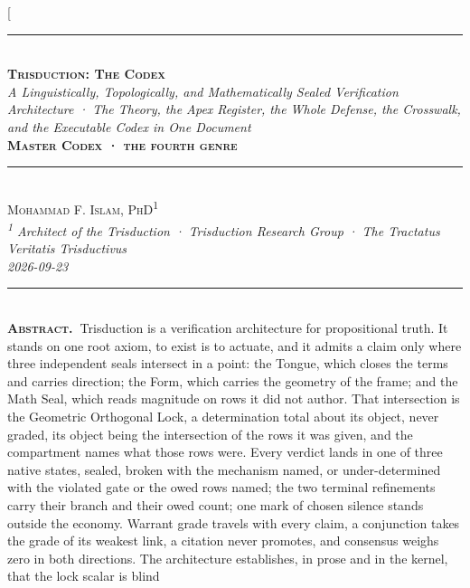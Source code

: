 \documentclass[10pt,twocolumn]{article}
\begin{document}
\twocolumn[{%
\begin{center}
{\color{accent}\rule{0.6\textwidth}{0.8pt}}\\[10pt]
{\bfseries\scshape\fontsize{20}{23}\selectfont Trisduction: The
Codex}\\[7pt]
{\itshape\large A Linguistically, Topologically, and Mathematically
Sealed Verification Architecture · The Theory, the Apex Register, the
Whole Defense, the Crosswalk, and the Executable Codex in One
Document}\\[8pt]
{\footnotesize\color{accent}\scshape\bfseries Master Codex · the fourth
genre}\\[3pt]

{\color{accent}\rule{0.6\textwidth}{0.8pt}}\\[10pt]
{\scshape Mohammad F. Islam, PhD\textsuperscript{1}}\\[2pt]
{\itshape\color{faint}\small \textsuperscript{1} Architect of the
Trisduction · Trisduction Research Group · The Tractatus Veritatis
Trisductivus}\\[2pt]
{\itshape\color{faint}\small 2026-09-23}\\[14pt]
\end{center}
\begin{minipage}{\textwidth}
{\color{accent}\rule{\textwidth}{0.6pt}}\\[4pt]
{\small\hspace{1em}\textbf{\scshape\color{deep}Abstract.\ }Trisduction
is a verification architecture for propositional truth. It stands on one
root axiom, to exist is to actuate, and it admits a claim only where
three independent seals intersect in a point: the Tongue, which closes
the terms and carries direction; the Form, which carries the geometry of
the frame; and the Math Seal, which reads magnitude on rows it did not
author. That intersection is the Geometric Orthogonal Lock, a
determination total about its object, never graded, its object being the
intersection of the rows it was given, and the compartment names what
those rows were. Every verdict lands in one of three native states,
sealed, broken with the mechanism named, or under-determined with the
violated gate or the owed rows named; the two terminal refinements carry
their branch and their owed count; one mark of chosen silence stands
outside the economy. Warrant grade travels with every claim, a
conjunction takes the grade of its weakest link, a citation never
promotes, and consensus weighs zero in both directions. The architecture
establishes, in prose and in the kernel, that the lock scalar is blind
}
\end{minipage}}
\end{document}
